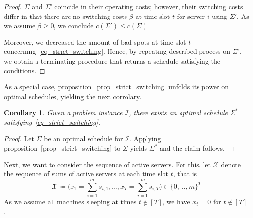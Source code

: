 \documentclass[hidelinks]{article}
\theoremstyle{plain}
\newtheorem{cor}[thm]{Corollary}
\theoremstyle{definition}
\theoremstyle{rem}
\newcommand{\mx}{\mathcal{X}}
\newcommand{\inp}{\mathcal{I}}
\newcommand{\costs}{c}
\newcommand{\fromto}[2]{\{#1,\ldots,#2\}}
\begin{document}
\begin{proof}
$\Sigma$ and $\Sigma'$ coincide in their operating costs; however, their switching costs differ in that there are no switching costs $\beta$ at time slot $t$ for server $i$ using $\Sigma'$. As we assume $\beta\ge0$, we conclude $\costs(\Sigma')\le \costs(\Sigma)$

Moreover, we decreased the amount of bad spots at time slot $t$ concerning~\eqref{eq_strict_switching}. Hence, by repeating described process on $\Sigma'$, we obtain a terminating procedure that returns a schedule satisfying the conditions.
\end{proof}

As a special case, proposition~\ref{prop_strict_switching} unfolds its power on optimal schedules, yielding the next corrolary.
\begin{cor}\label{cor_strict_opt_schedule}
Given a problem instance $\inp$, there exists an optimal schedule $\Sigma^*$ satisfying~\eqref{eq_strict_switching}.
\end{cor}
\begin{proof}
Let $\Sigma$ be an optimal schedule for $\inp$. Applying proposition~\ref{prop_strict_switching} to $\Sigma$ yields $\Sigma^*$ and the claim follows.
\end{proof}

Next, we want to consider the sequence of active servers. For this, let $\mx$ denote the sequence of sums of active servers at each time slot $t$, that is
\begin{equation*}
	\mx\coloneqq\bigl(x_1=\sum\limits_{i=1}^{m}s_{i,1},\ldots,x_T=\sum\limits_{i=1}^{m}s_{i,T}\bigr)\in\fromto{0}{m}^T
\end{equation*}
As we assume all machines sleeping at times $t\notin[T]$, we have $x_t=0$ for $t\notin[T]$.
\end{document}
